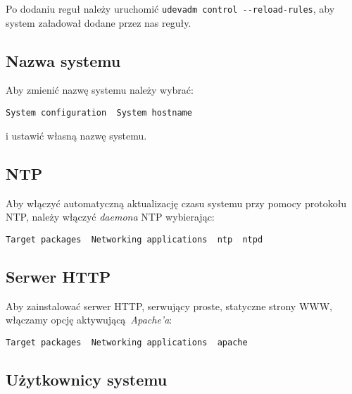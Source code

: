 \documentclass{article}
\begin{document}
Po dodaniu reguł należy uruchomić \texttt{udevadm control -{}-reload-rules}, aby system załadował dodane przez nas reguły.


\subsection{Nazwa systemu}

Aby zmienić nazwę systemu należy wybrać:

\begin{center}
\texttt{System configuration \textrightarrow\ System hostname}
\end{center}

\noindent i ustawić własną nazwę systemu.


\subsection{NTP}

Aby włączyć automatyczną aktualizację czasu systemu przy pomocy protokołu NTP, należy włączyć \emph{daemona} NTP wybierając:

\begin{center}
\texttt{Target packages \textrightarrow\ Networking applications \textrightarrow\ ntp \textrightarrow\ ntpd}
\end{center}


\subsection{Serwer HTTP}

Aby zainstalować serwer HTTP, serwujący proste, statyczne strony WWW, włączamy opcję aktywującą~\emph{Apache'a}:

\begin{center}
\texttt{Target packages \textrightarrow\ Networking applications \textrightarrow\ apache}
\end{center}


\subsection{Użytkownicy systemu}
\end{document}
